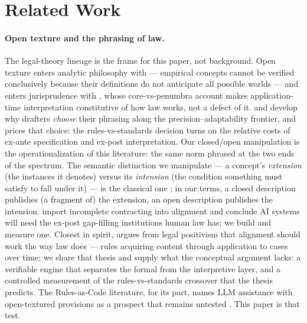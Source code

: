 \section{Related Work}

\paragraph{Open texture and the phrasing of law.}
The legal-theory lineage is the frame for this paper, not background. Open
texture enters analytic philosophy with \citet{waismann1945verifiability} ---
empirical concepts cannot be verified conclusively because their definitions
do not anticipate all possible worlds --- and enters jurisprudence with
\citet{hart1961concept}, whose core-vs-penumbra account makes application-time
interpretation constitutive of how law works, not a defect of it.
\citet{schauer1991playing,schauer2013open} and \citet{endicott2000vagueness}
develop why drafters \emph{choose} their phrasing along the
precision--adaptability frontier, and \citet{kaplow1992rules} prices that
choice: the rules-vs-standards decision turns on the relative costs of ex-ante
specification and ex-post interpretation. Our closed/open manipulation is the
operationalization of this literature: the same norm phrased at the two ends
of the spectrum. The semantic distinction we manipulate --- a concept's
\emph{extension} (the instances it denotes) versus its \emph{intension} (the
condition something must satisfy to fall under it) --- is the classical one
\citep{carnap1947meaning,putnam1975meaning}; in our terms, a closed
description publishes (a fragment of) the extension, an open description
publishes the intension. \citet{hadfield2019incomplete} import incomplete
contracting into alignment and conclude AI systems will need the ex-post
gap-filling institutions human law has; we build and measure one. Closest in
spirit, \citet{caputo2024positivist} argues from legal positivism that
alignment should work the way law does --- rules acquiring content through
application to cases over time; we share that thesis and supply what the
conceptual argument lacks: a verifiable engine that separates the formal
from the interpretive layer, and a controlled measurement of the
rules-vs-standards crossover that the thesis predicts. The Rules-as-Code
literature, for its part, names LLM assistance with open-textured provisions
as a prospect that remains untested \citep{lspr2025rulesascode}. This paper
is that test.

